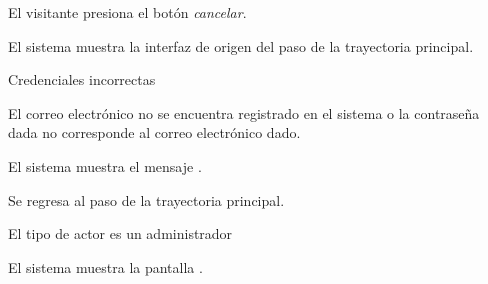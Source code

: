 {\begin{trayectoriaAlternativa}[ta:cancelar]
    \item El visitante presiona el botón \textit{cancelar}.

    \item El sistema muestra la interfaz de origen del paso
       de la trayectoria principal.

  \end{trayectoriaAlternativa}

  \begin{trayectoriaAlternativa}
    {Credenciales incorrectas}

    \item El correo electrónico no se encuentra registrado en el sistema o la
      contraseña dada no corresponde al correo electrónico dado.

    \item El sistema muestra el mensaje
      .

    \item Se regresa al paso  de la trayectoria
      principal.

  \end{trayectoriaAlternativa}

  \begin{trayectoriaAlternativa}[ta:administrador]
    {El tipo de actor es un administrador}

    \item El sistema muestra la pantalla
      .

  \end{trayectoriaAlternativa}
}

